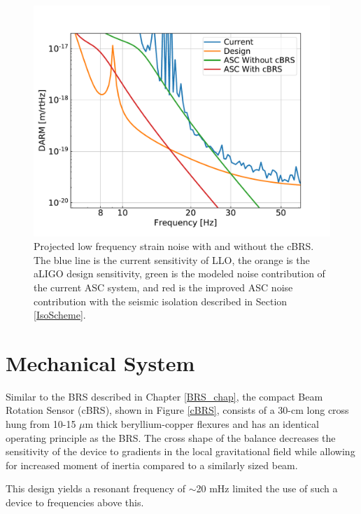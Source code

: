 \documentclass [12pt, proquest]{uwthesis}[2019]
\begin{document}
\begin{figure}
\begin{center}
\includegraphics[width=\textwidth]{cBRS_ASC.pdf}
\caption{Projected low frequency strain noise with and without the cBRS. The blue line is the current sensitivity of LLO, the orange is the aLIGO design sensitivity, green is the modeled noise contribution of the current ASC system, and red is the improved ASC noise contribution with the seismic isolation described in Section \ref{IsoScheme}. }
\label{ascStrain}
\end{center}
\end{figure}
\section{Mechanical System}

Similar to the BRS described in Chapter \ref{BRS_chap}, the compact Beam Rotation Sensor (cBRS), shown in Figure \ref{cBRS}, consists of a 30-cm long cross hung from 10-15 $\mu$m thick beryllium-copper flexures and has an identical operating principle as the BRS. The cross shape of the balance decreases the sensitivity of the device to gradients in the local gravitational field while allowing for increased moment of inertia compared to a similarly sized beam. 

This design yields a resonant frequency of $\sim$20 mHz limited the use of such a device to frequencies above this. 
\end{document}
